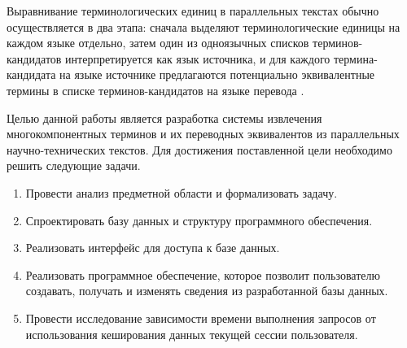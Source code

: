 Выравнивание терминологических единиц в параллельных текстах обычно осуществляется в два этапа: сначала выделяют терминологические единицы на каждом языке отдельно, затем один из одноязычных списков терминов-кандидатов интерпретируется как язык источника, и для каждого термина-кандидата на языке источнике предлагаются потенциально эквивалентные термины в списке терминов-кандидатов на языке перевода \cite{intro_10}.

Целью данной работы является разработка системы извлечения многокомпонентных терминов и их переводных эквивалентов из параллельных научно-технических текстов. Для достижения поставленной цели необходимо решить следующие задачи.

\begin{enumerate}[label*=\arabic*.]
	\item Провести анализ предметной области и формализовать задачу.
	\item Спроектировать базу данных и структуру программного обеспечения.
	\item Реализовать интерфейс для доступа к базе данных. 
	\item Реализовать программное обеспечение, которое позволит пользователю создавать, получать и изменять сведения из разработанной базы данных. 
	\item Провести исследование зависимости времени выполнения запросов от использования кеширования данных текущей сессии пользователя.
\end{enumerate}

\pagebreak